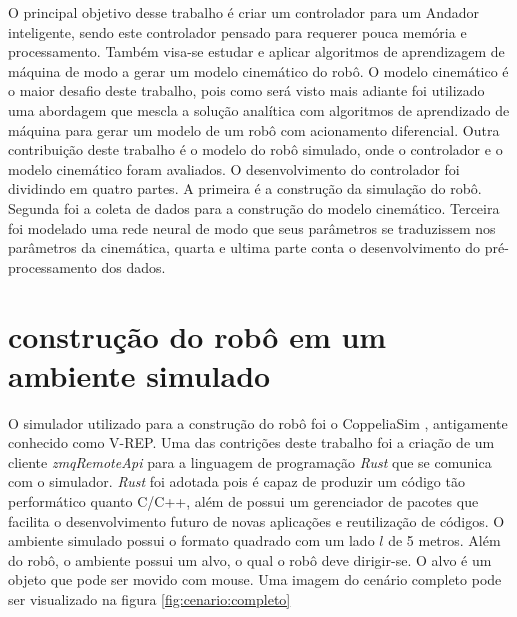
\label{Cap:Desenvolvimento}

O principal objetivo desse trabalho é criar um controlador para
um Andador inteligente, sendo este controlador pensado para requerer
pouca memória e processamento. Também visa-se estudar e aplicar algoritmos
de aprendizagem de máquina de modo a gerar um modelo cinemático do robô.
O modelo cinemático é o maior desafio deste trabalho, pois como será visto
mais adiante foi utilizado uma abordagem que mescla a solução analítica com
algoritmos de aprendizado de máquina para gerar um modelo de um robô com
acionamento diferencial. Outra contribuição deste trabalho é o modelo do
robô simulado, onde o controlador e o modelo cinemático foram avaliados.
O desenvolvimento do controlador foi dividindo em quatro partes. A primeira
é a construção da simulação do robô. Segunda foi a coleta de dados para
a construção do modelo cinemático. Terceira foi  modelado
uma rede neural de modo que seus parâmetros se traduzissem nos parâmetros
da cinemática, quarta e ultima parte conta o desenvolvimento
do pré-processamento dos dados. 


\section{construção do robô em um ambiente simulado}
O simulador utilizado para a construção do robô foi o CoppeliaSim
\cite{rooban2021coppeliasim}, antigamente conhecido como V-REP.
Uma das contrições deste trabalho foi a criação de um cliente 
\textit{zmqRemoteApi} para a linguagem de programação \textit{Rust}
que se comunica com o simulador. \textit{Rust} foi adotada pois
é capaz de produzir um código tão performático quanto C/C++, além
de possui um gerenciador de pacotes que facilita o desenvolvimento
futuro de novas aplicações e reutilização de códigos. O ambiente
simulado possui o formato quadrado com um lado $l$ de 5 metros.
Além do robô, o ambiente possui um alvo, o qual o robô deve
dirigir-se. O alvo é um objeto que pode ser movido com mouse. 
Uma imagem do cenário completo pode ser visualizado na figura
\ref{fig:cenario:completo}

